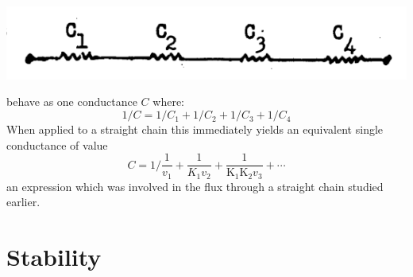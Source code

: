 \begin{center}
\includegraphics[scale=0.8]{figure1_conductance.png}
\end{center}

behave as one conductance $C$ where:
%
$$
1/C= 1/C_{1} + 1/C_{2} + 1/C_{3} + 1/C_{4}
$$
%
When applied to a straight chain this immediately yields an equivalent single conductance of value
%
$$
C = 1 \bigg/ \frac{1}{v_{1}} + \frac{1}{K_{1} v_{2}}+\frac{1}{\mathrm{K}_{1} \mathrm{K}_{2} v_{3}} + \cdots
$$
%
an expression which was involved in the flux through a straight chain studied earlier.

\section{Stability}

